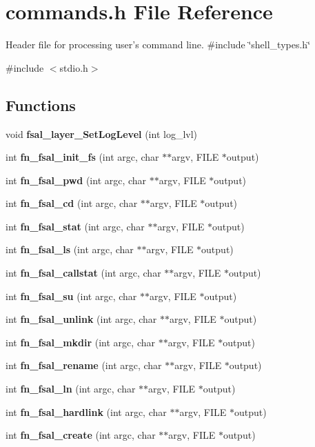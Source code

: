 \section{commands.h File Reference}
\label{commands_8h}


Header file for processing user's command line.  
{\ttfamily \#include \char`\"{}shell\_\-types.h\char`\"{}}\par
{\ttfamily \#include $<$stdio.h$>$}\par
\subsection*{Functions}
\begin{DoxyCompactItemize}
\item 
void {\bf fsal\_\-layer\_\-SetLogLevel} (int log\_\-lvl)
\item 
int {\bf fn\_\-fsal\_\-init\_\-fs} (int argc, char $\ast$$\ast$argv, FILE $\ast$output)
\item 
int {\bf fn\_\-fsal\_\-pwd} (int argc, char $\ast$$\ast$argv, FILE $\ast$output)
\item 
int {\bf fn\_\-fsal\_\-cd} (int argc, char $\ast$$\ast$argv, FILE $\ast$output)
\item 
int {\bf fn\_\-fsal\_\-stat} (int argc, char $\ast$$\ast$argv, FILE $\ast$output)
\item 
int {\bf fn\_\-fsal\_\-ls} (int argc, char $\ast$$\ast$argv, FILE $\ast$output)
\item 
int {\bf fn\_\-fsal\_\-callstat} (int argc, char $\ast$$\ast$argv, FILE $\ast$output)
\item 
int {\bf fn\_\-fsal\_\-su} (int argc, char $\ast$$\ast$argv, FILE $\ast$output)
\item 
int {\bf fn\_\-fsal\_\-unlink} (int argc, char $\ast$$\ast$argv, FILE $\ast$output)
\item 
int {\bf fn\_\-fsal\_\-mkdir} (int argc, char $\ast$$\ast$argv, FILE $\ast$output)
\item 
int {\bf fn\_\-fsal\_\-rename} (int argc, char $\ast$$\ast$argv, FILE $\ast$output)
\item 
int {\bf fn\_\-fsal\_\-ln} (int argc, char $\ast$$\ast$argv, FILE $\ast$output)
\item 
int {\bf fn\_\-fsal\_\-hardlink} (int argc, char $\ast$$\ast$argv, FILE $\ast$output)
\item 
int {\bf fn\_\-fsal\_\-create} (int argc, char $\ast$$\ast$argv, FILE $\ast$output)
\item 
$$
\end{DoxyCompactItemize}
